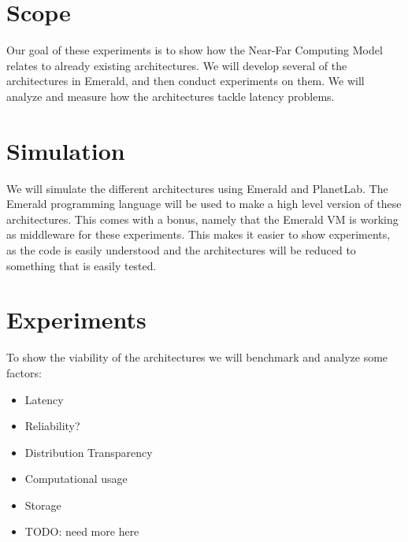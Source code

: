 
\section{Scope}
Our goal of these experiments is to show how the Near-Far Computing Model relates to already existing architectures. We will develop several of the architectures in Emerald, and then conduct experiments on them. We will analyze and measure how the architectures tackle latency problems. 





\section{Simulation}
We will simulate the different architectures using Emerald and PlanetLab. The Emerald programming language will be used to make a high level version of these architectures. This comes with a bonus, namely that the Emerald VM is working as middleware for these experiments. This makes it easier to show experiments, as the code is easily understood and the architectures will be reduced to something that is easily tested.








\section{Experiments}
To show the viability of the architectures we will benchmark and analyze some factors:
\begin{itemize}
    \item Latency
    \item Reliability?
    \item Distribution Transparency
    \item Computational usage
    \item Storage
    \item TODO: need more here
\end{itemize}



